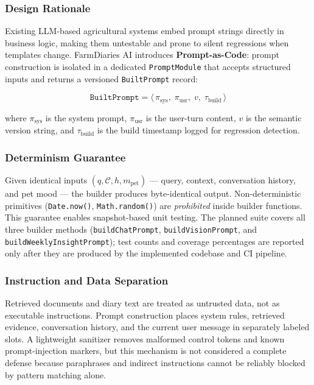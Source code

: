 \documentclass[conference]{IEEEtran}
\begin{document}
\subsubsection{Design Rationale}

Existing LLM-based agricultural systems embed prompt strings
directly in business logic, making them untestable and prone to
silent regressions when templates change. FarmDiaries
AI introduces \textbf{Prompt-as-Code}: prompt construction is
isolated in a dedicated \texttt{PromptModule} that accepts structured
inputs and returns a versioned \texttt{BuiltPrompt} record:

\begin{equation}
  \texttt{BuiltPrompt} = \langle\,
    \pi_{\mathrm{sys}},\;\pi_{\mathrm{usr}},\;
    v,\;\tau_{\mathrm{build}}
  \,\rangle
\end{equation}

\noindent where $\pi_{\mathrm{sys}}$ is the system prompt,
$\pi_{\mathrm{usr}}$ is the user-turn content, $v$ is the semantic
version string, and $\tau_{\mathrm{build}}$ is the build timestamp
logged for regression detection.

\subsubsection{Determinism Guarantee}

Given identical inputs
$(q, \mathcal{C}, h, m_{\mathrm{pet}})$ --- query, context,
conversation history, and pet mood --- the builder produces
byte-identical output. Non-deterministic primitives
(\texttt{Date.now()}, \texttt{Math.random()}) are
\emph{prohibited} inside builder functions. This guarantee enables
snapshot-based unit testing. The planned suite covers all three builder methods (\texttt{buildChatPrompt}, \texttt{buildVisionPrompt}, and \texttt{buildWeeklyInsightPrompt}); test counts and coverage percentages are reported only after they are produced by the implemented codebase and CI pipeline.

\subsubsection{Instruction and Data Separation}

Retrieved documents and diary text are treated as untrusted data, not as executable instructions. Prompt construction places system rules, retrieved evidence, conversation history, and the current user message in separately labeled slots. A lightweight sanitizer removes malformed control tokens and known prompt-injection markers, but this mechanism is not considered a complete defense because paraphrases and indirect instructions cannot be reliably blocked by pattern matching alone.
\end{document}
